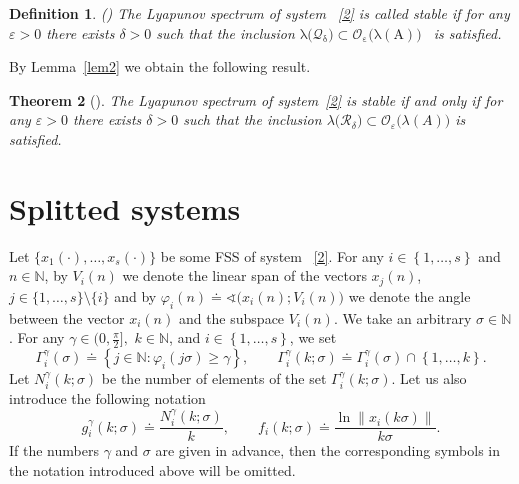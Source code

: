 \documentclass[11pt]{article}
\newtheorem{theorem}{Theorem}[section]
\newtheorem{definition}[theorem]{Definition}
\begin{document}
\begin{definition}
\label{UstAdd}(\cite{BP,Czornik}) \textrm{The Lyapunov spectrum of system~%
\eqref{2} is called \emph{stable} if for any $\varepsilon >0$ there exists
$\delta >0$ such that the inclusion }$\mathrm{\lambda \bigl(\mathcal{Q}%
_{\delta }\bigr)\subset \mathcal{O}_{\varepsilon }\bigl(\lambda (A)\bigr)}$%
\textrm{\ is satisfied.}
\end{definition}

By Lemma~\ref{lem2} we obtain the following result.

\begin{theorem}[\protect\cite{BP}]
\it
The Lyapunov spectrum of  system~\eqref{2} is stable if and only if for
any $\varepsilon >0$ there exists $\delta >0$ such that the inclusion $%
\lambda \bigl(\mathcal{R}_{\delta }\bigr)\subset \mathcal{O}_{\varepsilon }%
\bigl(\lambda (A)\bigr)$ is satisfied.
\end{theorem}

\section{Splitted systems} \label{sect4}

Let $\bigl\{x_{1}(\cdot ),\dots ,x_{s}(\cdot )\bigr\}$ be some FSS of system~%
\eqref{2}. For any $i\in \left\{ 1,\dots ,s\right\} $ and $n\in \mathbb{N}$,
by $V_{i}(n)$ we denote the linear span of the vectors $x_{j}(n)$, $j\in
\{1,\dots ,s\}\setminus \{i\}$ and by $\varphi _{i}(n)\doteq \sphericalangle %
\bigl(x_{i}(n);V_{i}(n)\bigr)$ we denote the angle between the vector $%
x_{i}(n)$ and the subspace $V_{i}(n)$. We take an arbitrary $\sigma \in 
\mathbb{N}$. For any $\gamma \in ( 0,\frac{\pi }{2}] ,$ $k\in 
\mathbb{N}$, and $i\in \left\{ 1,\dots ,s\right\} $, we set 
\begin{equation*}
\Gamma _{i}^{\gamma }( \sigma ) \doteq \left\{ j\in \mathbb{N}%
\colon \varphi _{i}(j\sigma )\ge \gamma \right\} ,
\qquad
\Gamma _{i}^{\gamma }( k;\sigma ) \doteq \Gamma _{i}^{\gamma
}( \sigma ) \cap \left\{ 1,\dots ,k\right\} .
\end{equation*}%
Let $N_{i}^{\gamma }( k;\sigma ) $ be the number of elements of
the set $\Gamma _{i}^{\gamma }( k;\sigma ) $. Let us also
introduce the following notation%
\begin{equation*}
g_{i}^{\gamma }( k;\sigma ) \doteq \frac{N_{i}^{\gamma }(
k;\sigma ) }{k},
\qquad
f_{i}( k;\sigma ) \doteq \frac{\ln \left\| x_{i}( k\sigma
) \right\| }{k\sigma }.
\end{equation*}%
If the numbers $\gamma $ and $\sigma $ are given in advance, then the
corresponding symbols in the 
notation introduced above will be omitted.
\end{document}

